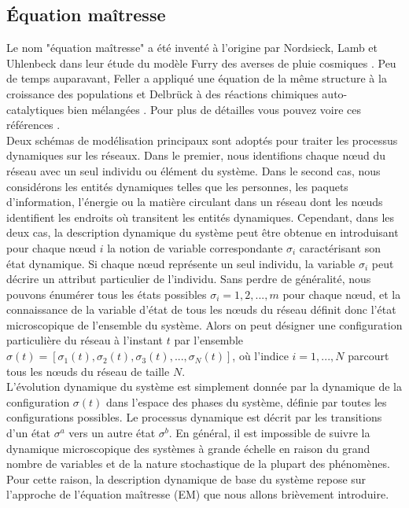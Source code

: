 \subsection{Équation maîtresse}
 
 
 
 
Le nom "équation maîtresse" a été inventé à l'origine par Nordsieck, Lamb et Uhlenbeck \cite{Nordsieck-al1940} dans leur étude du modèle Furry des averses de pluie cosmiques \cite{Furry1937}. Peu de temps auparavant, Feller a appliqué une équation de la même structure à la croissance des populations \cite{Feller1939} et Delbrück à des réactions chimiques auto-catalytiques bien mélangées \cite{Delbruck1940}. Pour plus de détailles vous pouvez voire ces références \cite{Kampen2007,Gardiner2009,Weber-Frey2017}.\\
Deux schémas de modélisation principaux sont adoptés pour traiter les processus dynamiques sur les réseaux. Dans le premier, nous identifions chaque nœud du réseau avec un seul individu ou élément du système. Dans le second cas, nous considérons les entités dynamiques telles que les personnes, les paquets d'information, l'énergie ou la matière circulant dans un réseau dont les nœuds identifient les endroits où transitent les entités dynamiques. Cependant, dans les deux cas, la description dynamique du système peut être obtenue en introduisant pour chaque nœud $i$ la notion de variable correspondante $\sigma_i$ caractérisant son état dynamique. Si chaque nœud représente un seul individu, la variable $\sigma_i$ peut décrire un attribut particulier de l'individu.
Sans perdre de généralité, nous pouvons énumérer tous les états possibles $\sigma_i=1, 2,. . ., m$ pour chaque nœud, et la connaissance de la variable d'état de tous les nœuds du réseau définit donc l'état microscopique de l'ensemble du système. Alors on peut désigner une configuration particulière du réseau à l'instant $t$ par l'ensemble $\sigma(t)=[\sigma_1(t),\sigma_2(t),\sigma_3(t), ...,\sigma_N(t)]$, où l'indice $i = 1,. . ., N$ parcourt tous les nœuds du réseau de taille $N$.\\
L'évolution dynamique du système est simplement donnée par la dynamique de la configuration $\sigma(t)$ dans l'espace des phases du système, définie par toutes les configurations possibles. Le processus dynamique est décrit par les transitions d'un état $\sigma^a$ vers un autre état $\sigma^b$. En général, il est impossible de suivre la dynamique microscopique des systèmes à grande échelle en raison du grand nombre de variables et de la nature stochastique de la plupart des phénomènes. Pour cette raison, la description dynamique de base du système repose sur l'approche de l'équation maîtresse (EM) que nous allons brièvement introduire.\\
